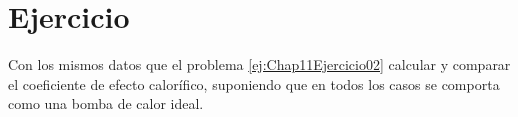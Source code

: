 \section{Ejercicio}\label{ej:Chap11Ejercicio03}
Con los mismos datos que el problema \ref{ej:Chap11Ejercicio02} calcular y comparar el coeficiente de efecto calorífico, suponiendo que en todos los casos se comporta como una bomba de calor ideal.